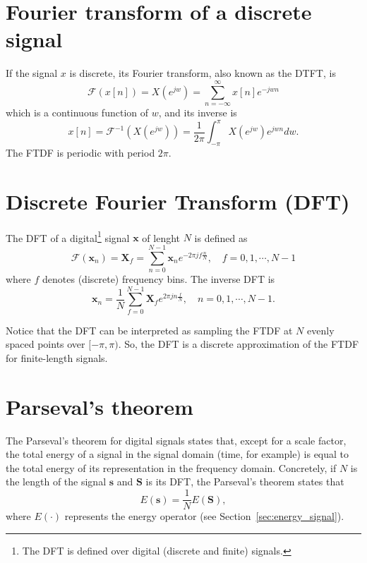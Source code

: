 
\section{Fourier transform of a discrete signal}
\label{sec:FTDF}

If the signal $x$ is discrete, its Fourier transform, also
known as the \gls{DTFT}, is
\begin{equation}
  \mathcal{F}(x[n]) = X(e^{jw}) = \sum_{n=-\infty}^{\infty}x[n]e^{-jwn}
\end{equation}
which is a continuous function of $w$, and its inverse is
\begin{equation}
  x[n] = \mathcal{F}^{-1}(X(e^{jw})) = \frac{1}{2\pi}\int_{-\pi}^{\pi}X(e^{jw})e^{jwn}dw.
\end{equation}
The \acrshort{FTDF} is periodic with period $2\pi$.


\section{Discrete Fourier Transform (DFT)}
\label{sec:DFT}

The \gls{DFT} of a digital\footnote{The \gls{DFT} is defined over
  digital (discrete and finite) signals.} signal $\mathbf{x}$ of
lenght $N$ is defined as
\begin{equation}
  \mathcal{F}(\mathbf{x}_n) = \mathbf{X}_f=\sum_{n=0}^{N-1}\mathbf{x}_ne^{-2\pi jf\frac{n}{N}},\quad f=0,1,\cdots,N-1
  \label{eq:DFT}
\end{equation}
where $f$ denotes (discrete) frequency bins. The inverse \gls{DFT} is
\begin{equation}
  \mathbf{x}_n=\frac{1}{N}\sum_{f=0}^{N-1}\mathbf{X}_fe^{2\pi jn\frac{f}{N}}, \quad  n=0,1,\cdots,N-1.
\end{equation}

Notice that the \gls{DFT} can be interpreted as sampling the
\gls{FTDF} at $N$ evenly spaced points over $[-\pi, \pi)$. So, the
\gls{DFT} is a discrete approximation of the \gls{FTDF} for
finite-length signals.


\section{Parseval's theorem}
\label{sec:parseval}

The Parseval's theorem for digital signals states that, except for a
scale factor, the total energy of a signal in the signal domain (time,
for example) is equal to the total energy of its representation in the
frequency domain. Concretely, if $N$ is the length of the signal
$\mathbf{s}$ and $\mathbf{S}$ is its \gls{DFT}, the Parseval’s theorem
states that
\begin{equation}
  E(\mathbf{s}) = \frac{1}{N}E(\mathbf{S}),
\end{equation}
where $E(\cdot)$ represents the energy operator (see
Section~\ref{sec:energy_signal}).

